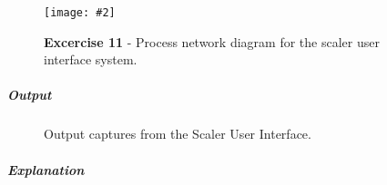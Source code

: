 \documentclass[10pt, a4paper]{article}
\newcommand{\figuremacro}[5]{
    \begin{figure}[#1]
        \centering
        \texttt{[image: \#2]}
        \caption[#3]{\textbf{#3}#4}
        \label{fig:#2}
    \end{figure}
}
\begin{document}
   \figuremacro{H}{UI}{Excercise 11}{ - Process network diagram for the scaler user interface system.}{1.0}
   
   \subparagraph{Output} \hfill
   
    \begin{figure}[h]
   	\centering
   	\hfil
   	\caption{Output captures from the Scaler User Interface.}
   	\label{uiOut}
   \end{figure}

   \subparagraph{Explanation}
   
   
   
  
	
\end{document}
